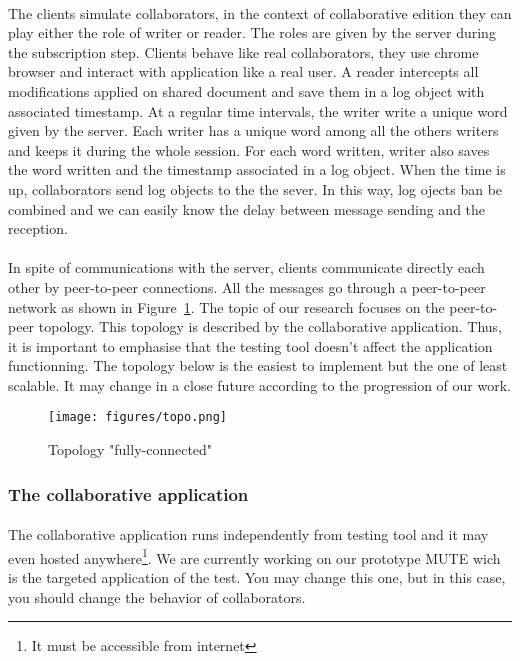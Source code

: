 \documentclass[twoside,twocolumn]{article}
\begin{document}
\paragraph{}
The clients simulate collaborators, in the context of collaborative edition they can play either the role of writer or reader.
The roles are given by the server during the subscription step. Clients behave like real collaborators, they use chrome browser and
interact with application like a real user. A reader intercepts all modifications applied on shared document and save them in a log object
with associated timestamp. At a regular time intervals, the writer write a unique word given by the server. Each writer has a unique word among all
the others writers and keeps it during the whole session. For each word written, writer also saves the word written and the timestamp associated in a
log object. When the time is up, collaborators send log objects to the the sever. In this way, log ojects ban be combined and we can easily know the delay
between message sending and the reception.
\paragraph{}
In spite of communications with the server, clients communicate directly each other by peer-to-peer connections. All the messages go through a
peer-to-peer network as shown in Figure~\ref{fig:topo}. The topic of our research focuses on the peer-to-peer topology. This topology is described by
the collaborative application. Thus, it is important to emphasise that the testing tool doesn't affect the application functionning. The topology below
is the easiest to implement but the one of least scalable. It may change in a close future according to the progression of our work.

\begin{figure}[h!]
  \centering
  \texttt{[image: figures/topo.png]}
  \caption{Topology "fully-connected"}
  \label{fig:topo}
\end{figure}

\subsubsection{The collaborative application}
\paragraph{}
The collaborative application runs independently from testing tool and it may even hosted anywhere\footnote{It must be accessible from internet}.
We are currently working on our prototype MUTE wich is the targeted application of the test.  You may change this one, but in this case, you should
change the behavior of collaborators.
\end{document}
